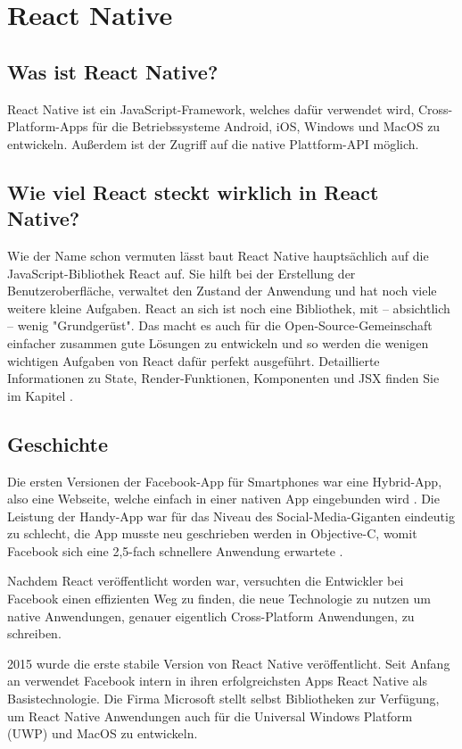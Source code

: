 \section{React Native}
\label{reactnative}

\subsection{Was ist React Native?}
React Native ist ein JavaScript-Framework, welches dafür verwendet wird, Cross-Platform-Apps für
die Betriebssysteme Android, iOS, Windows und MacOS zu entwickeln. Außerdem ist der Zugriff auf die
native Plattform-API möglich.

\subsection{Wie viel React steckt wirklich in React Native?}
Wie der Name schon vermuten lässt baut React Native hauptsächlich auf die JavaScript-Bibliothek
React auf. Sie hilft bei der Erstellung der Benutzeroberfläche, verwaltet den Zustand der
Anwendung und hat noch viele weitere kleine Aufgaben. React an sich ist noch eine Bibliothek,
mit -- absichtlich -- wenig "Grundgerüst". Das macht es auch für die Open-Source-Gemeinschaft
einfacher zusammen gute Lösungen zu entwickeln und so werden die wenigen wichtigen Aufgaben von
React dafür perfekt ausgeführt.
Detaillierte Informationen zu State, Render-Funktionen, Komponenten und JSX finden Sie im Kapitel
.

\subsection{Geschichte}
Die ersten Versionen der Facebook-App für Smartphones war eine Hybrid-App, also eine Webseite,
welche einfach in einer nativen App eingebunden wird \cite{reactNativeHistory}. Die Leistung der
Handy-App war für das Niveau des Social-Media-Giganten eindeutig zu schlecht, die App musste neu
geschrieben werden in Objective-C, womit Facebook sich eine 2,5-fach schnellere Anwendung erwartete
\cite{facebookNewIosApp}.

Nachdem React veröffentlicht worden war, versuchten die Entwickler bei Facebook einen effizienten
Weg zu finden, die neue Technologie zu nutzen um native Anwendungen, genauer eigentlich
Cross-Platform Anwendungen, zu schreiben.

2015 wurde die erste stabile Version von React Native veröffentlicht. Seit Anfang an verwendet
Facebook intern in ihren erfolgreichsten Apps React Native als Basistechnologie. Die Firma Microsoft
stellt selbst Bibliotheken zur Verfügung, um React Native Anwendungen auch für die Universal Windows
Platform (UWP) und MacOS zu entwickeln.

